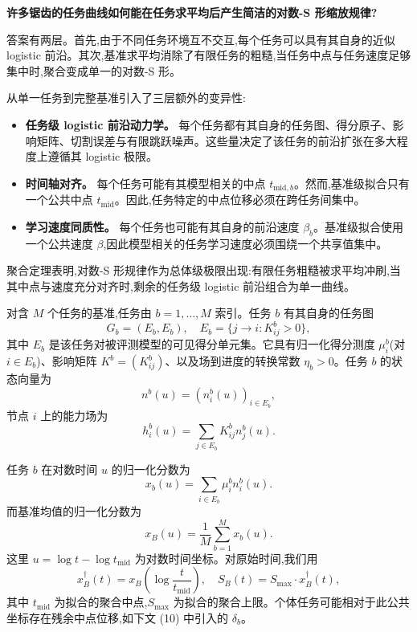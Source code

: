 \textbf{许多锯齿的任务曲线如何能在任务求平均后产生简洁的对数-S 形缩放规律?}

答案有两层。首先,由于不同任务环境互不交互,每个任务可以具有其自身的近似 logistic 前沿。其次,基准求平均消除了有限任务的粗糙,当任务中点与任务速度足够集中时,聚合变成单一的对数-S 形。

从单一任务到完整基准引入了三层额外的变异性:
\begin{itemize}
    \item \textbf{任务级 logistic 前沿动力学。} 每个任务都有其自身的任务图、得分原子、影响矩阵、切割误差与有限跳跃噪声。这些量决定了该任务的前沿扩张在多大程度上遵循其 logistic 极限。
    \item \textbf{时间轴对齐。} 每个任务可能有其模型相关的中点 $t_{\mathrm{mid}, b}$。然而,基准级拟合只有一个公共中点 $t_{\mathrm{mid}}$。因此,任务特定的中点位移必须在跨任务间集中。
    \item \textbf{学习速度同质性。} 每个任务也可能有其自身的前沿速度 $\beta_{b}$。基准级拟合使用一个公共速度 $\beta$,因此模型相关的任务学习速度必须围绕一个共享值集中。
\end{itemize}

聚合定理表明,对数-S 形规律作为总体级极限出现:有限任务粗糙被求平均冲刷,当其中点与速度充分对齐时,剩余的任务级 logistic 前沿组合为单一曲线。

\begin{definition}[基准任务图与状态]
对含 $M$ 个任务的基准,任务由 $b = 1, \ldots, M$ 索引。任务 $b$ 有其自身的任务图
\[
    G_{b} = (E_{b}, E_{b}), \quad E_{b} = \{j \to i : K^{b}_{ij} > 0\},
\]
其中 $E_{b}$ 是该任务对被评测模型的可见得分单元集。它具有归一化得分测度 $\mu^{b}_{i}$(对 $i \in E_{b}$)、影响矩阵 $K^{b} = (K^{b}_{ij})$、以及场到进度的转换常数 $\eta_{b} > 0$。任务 $b$ 的状态向量为
\[
    n^{b}(u) = (n^{b}_{i}(u))_{i \in E_{b}},
\]
节点 $i$ 上的能力场为
\[
    h^{b}_{i}(u) = \sum_{j \in E_{b}} K^{b}_{ij} n^{b}_{j}(u).
\]
\end{definition}

\begin{definition}[任务分数与基准均值]
任务 $b$ 在对数时间 $u$ 的归一化分数为
\[
    x_{b}(u) = \sum_{i \in E_{b}} \mu^{b}_{i} n^{b}_{i}(u).
\]
而基准均值的归一化分数为
\[
    x_{B}(u) = \frac{1}{M} \sum_{b=1}^{M} x_{b}(u).
\]
这里 $u = \log t - \log t_{\mathrm{mid}}$ 为对数时间坐标。对原始时间,我们用
\[
    x^{\dagger}_{B}(t) = x_{B}\!\left( \log \frac{t}{t_{\mathrm{mid}}} \right), \quad
    S_{B}(t) = S_{\max} \cdot x^{\dagger}_{B}(t),
\]
其中 $t_{\mathrm{mid}}$ 为拟合的聚合中点,$S_{\max}$ 为拟合的聚合上限。个体任务可能相对于此公共坐标存在残余中点位移,如下文 (10) 中引入的 $\delta_{b}$。
\end{definition}

